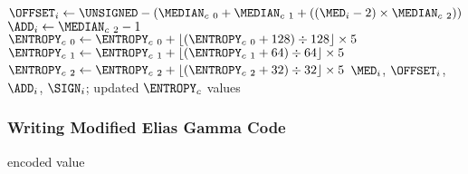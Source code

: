 {{{    $\text{\OFFSET}_i \leftarrow \text{\UNSIGNED} - (\text{\MEDIAN}_{c~0} + \text{\MEDIAN}_{c~1} + ((\text{\MED}_i - 2) \times \text{\MEDIAN}_{c~2}))$\;
    $\text{\ADD}_i \leftarrow \text{\MEDIAN}_{c~2} - 1$\;
    $\text{\ENTROPY}_{c~0} \leftarrow \text{\ENTROPY}_{c~0} + \lfloor(\text{\ENTROPY}_{c~0} + 128) \div 128\rfloor \times 5$\;
    $\text{\ENTROPY}_{c~1} \leftarrow \text{\ENTROPY}_{c~1} + \lfloor(\text{\ENTROPY}_{c~1} + 64) \div 64\rfloor \times 5$\;
    $\text{\ENTROPY}_{c~2} \leftarrow \text{\ENTROPY}_{c~2} + \lfloor(\text{\ENTROPY}_{c~2} + 32) \div 32\rfloor \times 5$\;
  }
  \Return $\text{\MED}_i$, $\text{\OFFSET}_i$, $\text{\ADD}_i$, $\text{\SIGN}_i$; updated $\text{\ENTROPY}_c$ values\;
  \EALGORITHM

  \subsubsection{Writing Modified Elias Gamma Code}
  \Return encoded value\;
  \EALGORITHM
}

\clearpage

{
}}
